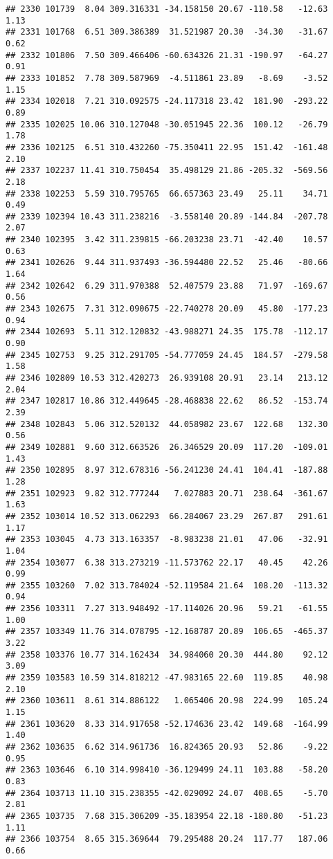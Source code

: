 \documentclass[]{article}
\begin{document}
\begin{verbatim}
## 2330 101739  8.04 309.316331 -34.158150 20.67 -110.58   -12.63  1.13
## 2331 101768  6.51 309.386389  31.521987 20.30  -34.30   -31.67  0.62
## 2332 101806  7.50 309.466406 -60.634326 21.31 -190.97   -64.27  0.91
## 2333 101852  7.78 309.587969  -4.511861 23.89   -8.69    -3.52  1.15
## 2334 102018  7.21 310.092575 -24.117318 23.42  181.90  -293.22  0.89
## 2335 102025 10.06 310.127048 -30.051945 22.36  100.12   -26.79  1.78
## 2336 102125  6.51 310.432260 -75.350411 22.95  151.42  -161.48  2.10
## 2337 102237 11.41 310.750454  35.498129 21.86 -205.32  -569.56  2.18
## 2338 102253  5.59 310.795765  66.657363 23.49   25.11    34.71  0.49
## 2339 102394 10.43 311.238216  -3.558140 20.89 -144.84  -207.78  2.07
## 2340 102395  3.42 311.239815 -66.203238 23.71  -42.40    10.57  0.63
## 2341 102626  9.44 311.937493 -36.594480 22.52   25.46   -80.66  1.64
## 2342 102642  6.29 311.970388  52.407579 23.88   71.97  -169.67  0.56
## 2343 102675  7.31 312.090675 -22.740278 20.09   45.80  -177.23  0.94
## 2344 102693  5.11 312.120832 -43.988271 24.35  175.78  -112.17  0.90
## 2345 102753  9.25 312.291705 -54.777059 24.45  184.57  -279.58  1.58
## 2346 102809 10.53 312.420273  26.939108 20.91   23.14   213.12  2.04
## 2347 102817 10.86 312.449645 -28.468838 22.62   86.52  -153.74  2.39
## 2348 102843  5.06 312.520132  44.058982 23.67  122.68   132.30  0.56
## 2349 102881  9.60 312.663526  26.346529 20.09  117.20  -109.01  1.43
## 2350 102895  8.97 312.678316 -56.241230 24.41  104.41  -187.88  1.28
## 2351 102923  9.82 312.777244   7.027883 20.71  238.64  -361.67  1.63
## 2352 103014 10.52 313.062293  66.284067 23.29  267.87   291.61  1.17
## 2353 103045  4.73 313.163357  -8.983238 21.01   47.06   -32.91  1.04
## 2354 103077  6.38 313.273219 -11.573762 22.17   40.45    42.26  0.99
## 2355 103260  7.02 313.784024 -52.119584 21.64  108.20  -113.32  0.94
## 2356 103311  7.27 313.948492 -17.114026 20.96   59.21   -61.55  1.00
## 2357 103349 11.76 314.078795 -12.168787 20.89  106.65  -465.37  3.22
## 2358 103376 10.77 314.162434  34.984060 20.30  444.80    92.12  3.09
## 2359 103583 10.59 314.818212 -47.983165 22.60  119.85    40.98  2.10
## 2360 103611  8.61 314.886122   1.065406 20.98  224.99   105.24  1.15
## 2361 103620  8.33 314.917658 -52.174636 23.42  149.68  -164.99  1.40
## 2362 103635  6.62 314.961736  16.824365 20.93   52.86    -9.22  0.95
## 2363 103646  6.10 314.998410 -36.129499 24.11  103.88   -58.20  0.83
## 2364 103713 11.10 315.238355 -42.029092 24.07  408.65    -5.70  2.81
## 2365 103735  7.68 315.306209 -35.183954 22.18 -180.80   -51.23  1.11
## 2366 103754  8.65 315.369644  79.295488 20.24  117.77   187.06  0.66

\end{verbatim}
\end{document}
